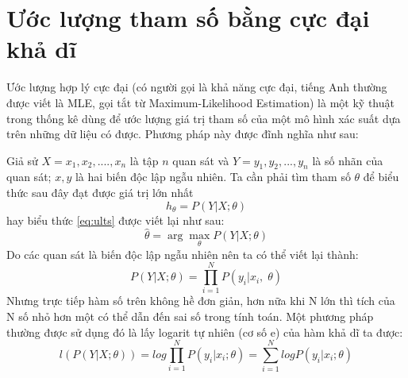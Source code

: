 \section{Ước lượng tham số bằng cực đại khả dĩ}
 Ước lượng hợp lý cực đại (có người gọi là khả năng cực đại, tiếng Anh thường được viết là MLE, gọi tắt từ Maximum-Likelihood Estimation) là một kỹ thuật trong thống kê dùng để ước lượng giá trị tham số của một mô hình xác suất dựa trên những dữ liệu có được. Phương pháp này được đĩnh nghĩa như sau:\par
Giả sử $X=x_1,x_2,....,x_n$ là tập $n$ quan sát và $Y=y_1,y_2,...,y_n$ là số nhãn của quan sát; $x,y$ là hai biến độc lập ngẫu nhiên. Ta cần phải tìm tham số $\theta$ để biểu thức sau đây đạt được giá trị lớn nhất
\begin{equation}
\label{eq:ults}
h_{\theta} = P(Y|X;\theta)
\end{equation} 
hay biểu thức \ref{eq:ults} được viết lại như sau:
\begin{equation}
\widehat{\theta} = \arg\max_{\theta}P(Y|X;\theta)
\end{equation}
Do các quan sát là biến độc lập ngẫu nhiên nên ta có thể viết lại thành:
\begin{equation}
P(Y|X;\theta) = \prod^N_{i=1}P(y_i|x_i,\;\theta)
\end{equation}
Nhưng trực tiếp hàm số trên không hề đơn giản, hơn nữa khi N lớn thì tích của N số nhỏ hơn một có thể dẫn đến sai số trong tính toán. Một phương pháp thường được sử dụng đó là lấy logarit	tự nhiên (cơ số e) của hàm khả dĩ ta được:
\begin{equation}
l(P(Y|X;\theta)) = log\prod_{i=1}^N P(y_i|x_i;\theta)=\sum_{i=1}^NlogP(y_i|x_i;\theta)
\end{equation}
